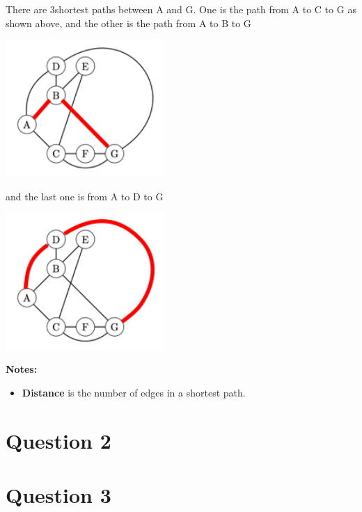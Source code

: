 \documentclass[12pt]{article}
\begin{document}
\begin{enumerate}[a.]
\begin{mdframed}
        \bigskip

        There are \color{red}3\color{black}\:shortest paths between A and G. One
        is the path from A to C to G as shown above, and the other is the path
        from A to B to G

        \begin{center}
        \includegraphics[width=6cm]{images/worksheet_19_q1d2_solution.png}
        \end{center}

        \color{red}
        and the last one is from A to D to G

        \begin{center}
        \includegraphics[width=6cm]{images/worksheet_19_q1d3_solution.png}
        \end{center}
        \color{black}
    \end{mdframed}

    \bigskip

    \textbf{Notes:}

    \begin{itemize}
     \item \textbf{Distance} is the number of edges in a shortest path.
    \end{itemize}

\end{enumerate}

\section*{Question 2}

\section*{Question 3}
\end{document}
